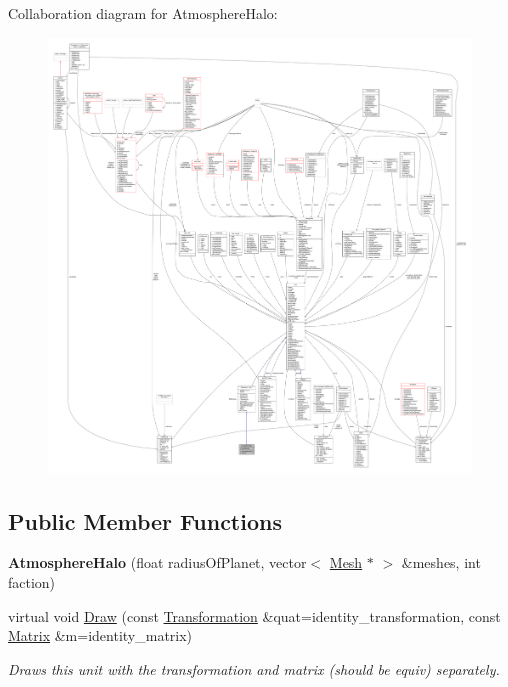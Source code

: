Collaboration diagram for Atmosphere\+Halo\+:
\nopagebreak
\begin{figure}[H]
\begin{center}
\leavevmode
\includegraphics[width=350pt]{db/d30/classAtmosphereHalo__coll__graph}
\end{center}
\end{figure}
\subsection*{Public Member Functions}
\begin{DoxyCompactItemize}
\item 
{\bfseries Atmosphere\+Halo} (float radius\+Of\+Planet, vector$<$ \hyperlink{classMesh}{Mesh} $\ast$ $>$ \&meshes, int faction)\hypertarget{classAtmosphereHalo_ab753b8f6a268deb94a43d66cc7b23b8e}{}\label{classAtmosphereHalo_ab753b8f6a268deb94a43d66cc7b23b8e}

\item 
virtual void \hyperlink{classAtmosphereHalo_a22e0efeb28321a7341756554d4dc0167}{Draw} (const \hyperlink{structTransformation}{Transformation} \&quat=identity\+\_\+transformation, const \hyperlink{classMatrix}{Matrix} \&m=identity\+\_\+matrix)\hypertarget{classAtmosphereHalo_a22e0efeb28321a7341756554d4dc0167}{}\label{classAtmosphereHalo_a22e0efeb28321a7341756554d4dc0167}

\begin{DoxyCompactList}\small\item\em Draws this unit with the transformation and matrix (should be equiv) separately. \end{DoxyCompactList}\end{DoxyCompactItemize}
